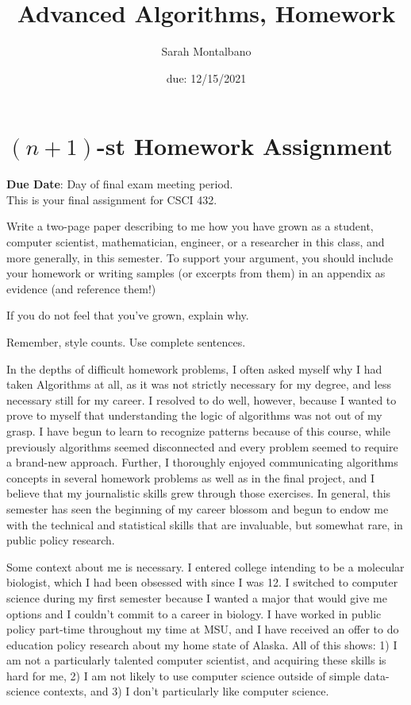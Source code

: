 \documentclass{article}
\title{Advanced Algorithms, Homework \hwnum}
\author{Sarah Montalbano}
\date{due: 12/15/2021}
\begin{document}
\section*{$(n+1)$-st Homework Assignment}

{\bf{Due Date}}: Day of final exam meeting period.\\

This is your final assignment for CSCI 432.

Write a two-page paper describing to me how you have grown as a student,
computer scientist, mathematician, engineer, or a researcher in this class, and
more generally, in this semester.  To support your argument, you should include
your homework or writing samples (or excerpts from them) in an appendix as
evidence (and reference them!)

If you do not feel that you've grown, explain why.

Remember, style counts. Use complete sentences.

\newpage


In the depths of difficult homework problems, I often asked myself why I had taken Algorithms at all, as it was not strictly necessary for my degree, and less necessary still for my career. I resolved to do well, however, because I wanted to prove to myself that understanding the logic of algorithms was not out of my grasp. I have begun to learn to recognize patterns because of this course, while previously algorithms seemed disconnected and every problem seemed to require a brand-new approach. Further, I thoroughly enjoyed communicating algorithms concepts in several homework problems as well as in the final project, and I believe that my journalistic skills grew through those exercises. In general, this semester has seen the beginning of my career blossom and begun to endow me with the technical and statistical skills that are invaluable, but somewhat rare, in public policy research. 

Some context about me is necessary. I entered college intending to be a molecular biologist, which I had been obsessed with since I was 12. I switched to computer science during my first semester because I wanted a major that would give me options and I couldn't commit to a career in biology. I have worked in public policy part-time throughout my time at MSU, and I have received an offer to do education policy research about my home state of Alaska. All of this shows: 1) I am not a particularly talented computer scientist, and acquiring these skills is hard for me, 2) I am not likely to use computer science outside of simple data-science contexts, and 3) I don't particularly like computer science. 
\end{document}
